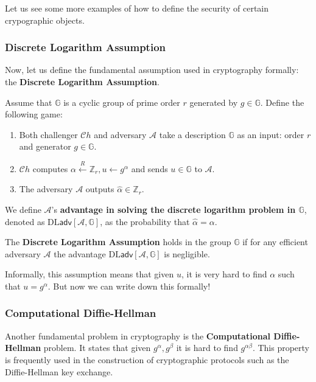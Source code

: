 \documentclass[../lecture-notes.tex]{subfiles}
\begin{document}
Let us see some more examples of how to define the security of certain crypographic objects.

\subsubsection{Discrete Logarithm Assumption}

Now, let us define the fundamental assumption used in cryptography formally: the \textbf{Discrete Logarithm Assumption}.

\begin{definition}
    Assume that $\mathbb{G}$ is a cyclic group of prime order $r$ generated by $g \in \mathbb{G}$. Define the following game:
    \begin{enumerate}
        \item Both challenger $\mathcal{C}h$ and adversary $\mathcal{A}$ take a description $\mathbb{G}$ as an input: order $r$ and generator $g \in \mathbb{G}$.
        \item $\mathcal{C}h$ computes $\alpha \xleftarrow{R} \mathbb{Z}_r, u \gets g^{\alpha}$ and sends $u \in \mathbb{G}$ to $\mathcal{A}$.
        \item The adversary $\mathcal{A}$ outputs $\hat{\alpha} \in \mathbb{Z}_r$.
    \end{enumerate}

    We define $\mathcal{A}$'s \textbf{advantage in solving the discrete logarithm problem in $\mathbb{G}$}, denoted as $\text{DL}\mathsf{adv}[\mathcal{A},\mathbb{G}]$, as the probability that $\hat{\alpha} = \alpha$.
\end{definition}

\begin{definition}
    The \textbf{Discrete Logarithm Assumption} holds in the group $\mathbb{G}$ if for any efficient adversary $\mathcal{A}$ the advantage $\text{DL}\mathsf{adv}[\mathcal{A},\mathbb{G}]$ is negligible.
\end{definition}

Informally, this assumption means that given $u$, it is very hard to find $\alpha$ such that $u = g^{\alpha}$. But now we can write down this formally!

\subsubsection{Computational Diffie-Hellman}

Another fundamental problem in cryptography is the \textbf{Computational Diffie-Hellman} problem. It states that given $g^{\alpha},g^{\beta}$ it is hard to find $g^{\alpha\beta}$. This property is frequently used in the construction of cryptographic protocols such as the Diffie-Hellman key exchange.
\end{document}

